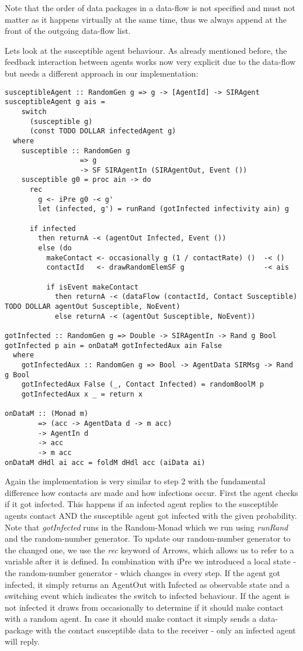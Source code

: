Note that the order of data packages in a data-flow is not specified and must not matter as it happens virtually at the same time, thus we always append at the front of the outgoing data-flow list.

Lets look at the susceptible agent behaviour. As already mentioned before, the feedback interaction between agents works now very explicit due to the data-flow but needs a different approach in our implementation:

\begin{verbatim}
susceptibleAgent :: RandomGen g => g -> [AgentId] -> SIRAgent
susceptibleAgent g ais = 
    switch 
      (susceptible g) 
      (const TODO DOLLAR infectedAgent g)
  where
    susceptible :: RandomGen g 
                  => g 
                  -> SF SIRAgentIn (SIRAgentOut, Event ())
    susceptible g0 = proc ain -> do
      rec
        g <- iPre g0 -< g'
        let (infected, g') = runRand (gotInfected infectivity ain) g

      if infected 
        then returnA -< (agentOut Infected, Event ())
        else (do
          makeContact <- occasionally g (1 / contactRate) ()  -< ()
          contactId   <- drawRandomElemSF g                   -< ais

          if isEvent makeContact
            then returnA -< (dataFlow (contactId, Contact Susceptible) TODO DOLLAR agentOut Susceptible, NoEvent)
            else returnA -< (agentOut Susceptible, NoEvent))
            
gotInfected :: RandomGen g => Double -> SIRAgentIn -> Rand g Bool
gotInfected p ain = onDataM gotInfectedAux ain False
  where
    gotInfectedAux :: RandomGen g => Bool -> AgentData SIRMsg -> Rand g Bool
    gotInfectedAux False (_, Contact Infected) = randomBoolM p
    gotInfectedAux x _ = return x
    
onDataM :: (Monad m) 
        => (acc -> AgentData d -> m acc) 
        -> AgentIn d 
        -> acc 
        -> m acc
onDataM dHdl ai acc = foldM dHdl acc (aiData ai)
\end{verbatim}

Again the implementation is very similar to step 2 with the fundamental difference how contacts are made and how infections occur. First the agent checks if it got infected. This happens if an infected agent replies to the susceptible agents contact AND the susceptible agent got infected with the given probability. Note that \textit{gotInfected} runs in the Random-Monad which we run using \textit{runRand} and the random-number generator. To update our random-number generator to the changed one, we use the \textit{rec} keyword of Arrows, which allows us to refer to a variable after it is defined. In combination with iPre we introduced a local state - the random-number generator - which changes in every step.
If the agent got infected, it simply returns an AgentOut with Infected as observable state and a switching event which indicates the switch to infected behaviour.
If the agent is not infected it draws from occasionally to determine if it should make contact with a random agent. In case it should make contact it simply sends a data-package with the contact susceptible data to the receiver - only an infected agent will reply.

